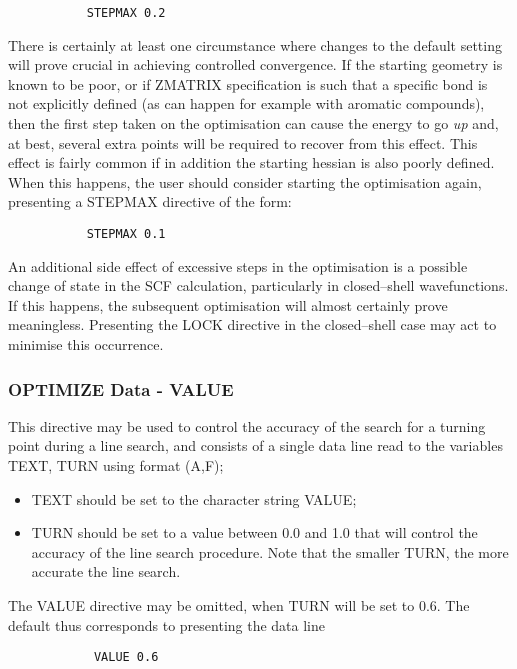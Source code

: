 \documentclass[11pt,fleqn]{article}
\begin{document}
{
\footnotesize
\begin{verbatim}
           STEPMAX 0.2
\end{verbatim}
}
There is certainly at least one circumstance where changes to
the default setting will prove crucial in achieving controlled
convergence. If the starting geometry is known to be poor, or
if ZMATRIX specification is such that a specific bond is not
explicitly defined (as can happen for example with aromatic
compounds), then the first step taken on the optimisation
can cause the energy to go {\em up} and, at best,  several extra points
will be required to recover from this effect. This effect
is fairly common if in addition the starting hessian is also poorly
defined. When this happens, the user should consider starting
the optimisation again, presenting a STEPMAX directive of the 
form:

{
\footnotesize
\begin{verbatim}
           STEPMAX 0.1
\end{verbatim}
}
An additional side effect of excessive steps in the optimisation
is a possible change of state in the SCF calculation, particularly
in closed--shell wavefunctions. If this happens, the subsequent
optimisation will almost certainly prove meaningless. 
Presenting the LOCK directive in the closed--shell case may
act to minimise this occurrence.

\subsubsection[OPTIMIZE Data - VALUE]{OPTIMIZE Data - VALUE}

This directive may be used to 
control the accuracy of the search for a turning point during
a line search, and consists of a single data line read to
the variables TEXT, TURN using format (A,F);
\begin{itemize}
\item TEXT should be set to the character string VALUE;
\item TURN should be set to a value between 0.0 and 1.0 
that will control the accuracy of the line search procedure. Note
that the smaller TURN, the more accurate the line search.
\end{itemize}
The VALUE directive may be omitted, when TURN will be set to 0.6.
The default thus corresponds to presenting the data line

{
\footnotesize
\begin{verbatim}
            VALUE 0.6
\end{verbatim}
}
\end{document}
